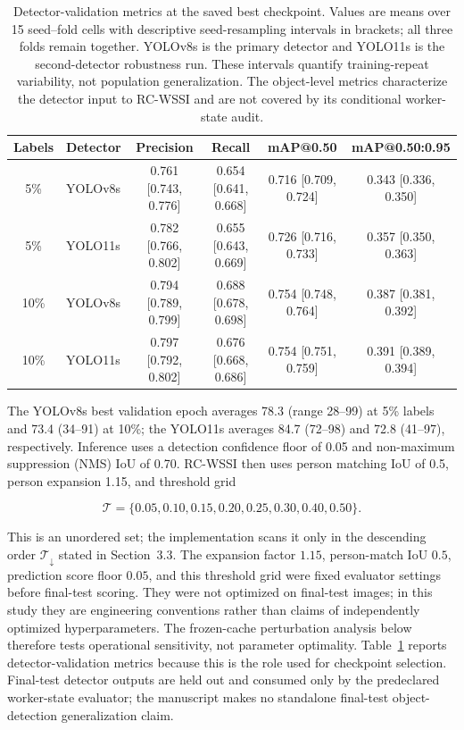 \documentclass[iicol,pdflatex,sn-mathphys-num]{sn-jnl}
\begin{document}
\begin{table}[t]
\caption{Detector-validation metrics at the saved best checkpoint. Values are means over 15 seed--fold cells with descriptive seed-resampling intervals in brackets; all three folds remain together. YOLOv8s is the primary detector and YOLO11s is the second-detector robustness run. These intervals quantify training-repeat variability, not population generalization. The object-level metrics characterize the detector input to RC-WSSI and are not covered by its conditional worker-state audit.}
\label{tab:detector}
\centering
\scriptsize
\setlength{\tabcolsep}{5pt}
\begin{tabular}{@{}c l c c c c@{}}
\toprule
Labels & Detector & Precision & Recall & mAP@0.50 & mAP@0.50:0.95 \\
\midrule
5\%  & YOLOv8s & 0.761 [0.743, 0.776] & 0.654 [0.641, 0.668] & 0.716 [0.709, 0.724] & 0.343 [0.336, 0.350] \\
5\%  & YOLO11s & 0.782 [0.766, 0.802] & 0.655 [0.643, 0.669] & 0.726 [0.716, 0.733] & 0.357 [0.350, 0.363] \\
10\% & YOLOv8s & 0.794 [0.789, 0.799] & 0.688 [0.678, 0.698] & 0.754 [0.748, 0.764] & 0.387 [0.381, 0.392] \\
10\% & YOLO11s & 0.797 [0.792, 0.802] & 0.676 [0.668, 0.686] & 0.754 [0.751, 0.759] & 0.391 [0.389, 0.394] \\
\bottomrule
\end{tabular}
\end{table}

The YOLOv8s best validation epoch averages 78.3 (range 28--99) at 5\% labels and 73.4 (34--91) at 10\%; the YOLO11s averages 84.7 (72--98) and 72.8 (41--97), respectively. Inference uses a detection confidence floor of 0.05 and non-maximum suppression (NMS) IoU of 0.70. RC-WSSI then uses person matching IoU of 0.5, person expansion 1.15, and threshold grid

\begin{equation}
\mathcal{T}=\{0.05,0.10,0.15,0.20,0.25,0.30,0.40,0.50\}.
\end{equation}

This is an unordered set; the implementation scans it only in the descending order $\mathcal{T}_{\downarrow}$ stated in Section~3.3. The expansion factor $1.15$, person-match IoU $0.5$, prediction score floor $0.05$, and this threshold grid were fixed evaluator settings before final-test scoring. They were not optimized on final-test images; in this study they are engineering conventions rather than claims of independently optimized hyperparameters. The frozen-cache perturbation analysis below therefore tests operational sensitivity, not parameter optimality. Table~\ref{tab:detector} reports detector-validation metrics because this is the role used for checkpoint selection. Final-test detector outputs are held out and consumed only by the predeclared worker-state evaluator; the manuscript makes no standalone final-test object-detection generalization claim.
\end{document}

